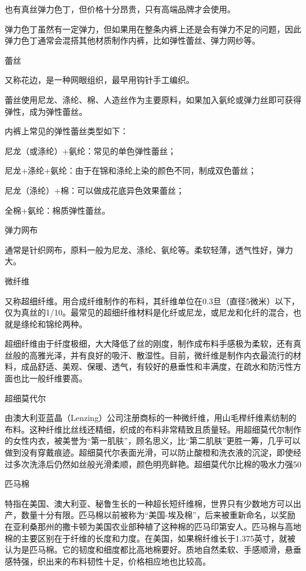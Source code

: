 \documentclass[12pt,UTF8]{ctexbook}
\begin{document}
也有真丝弹力色丁，但价格十分昂贵，只有高端品牌才会使用。

弹力色丁虽然有一定弹力，但如果用在整条内裤上还是会有弹力不足的问题，因此弹力色丁通常会混搭其他材质制作内裤，比如弹性蕾丝、弹力网纱等。

蕾丝

又称花边，是一种网眼组织，最早用钩针手工编织。

蕾丝使用尼龙、涤纶、棉、人造丝作为主要原料，如果加入氨纶或弹力丝即可获得弹性，成为弹性蕾丝。

内裤上常见的弹性蕾丝类型如下：

尼龙（或涤纶）+氨纶：常见的单色弹性蕾丝；

尼龙+涤纶+氨纶：由于在锦和涤纶上染的颜色不同，制成双色蕾丝；

尼龙（涤纶）+棉：可以做成花底异色效果蕾丝；

全棉+氨纶：棉质弹性蕾丝。

弹力网布

通常是针织网布，原料一般为尼龙、涤纶、氨纶等。柔软轻薄，透气性好，弹力大。

微纤维

又称超细纤维。用合成纤维制作的布料，其纤维单位在0.3旦（直径5微米）以下，仅为真丝的1/10。最常见的超细纤维材料是化纤或尼龙，或尼龙和化纤的混合，也就是绦纶和锦纶两种。

超细纤维由于纤度极细，大大降低了丝的刚度，制作成布料手感极为柔软，还有真丝般的高雅光泽，并有良好的吸汗、散湿性。目前，微纤维是制作内衣最流行的材料，成品舒适、美观、保暖、透气，有较好的悬垂性和丰满度，在疏水和防污性方面也比一般纤维要高。

超细莫代尔

由澳大利亚蓝晶（Lenzing）公司注册商标的一种微纤维，用山毛榉纤维素纺制的布料。这种纤维比丝线还精细，织成的布料非常精致且质量轻。用超细莫代尔制作的女性内衣，被美誉为“第一肌肤”，顾名思义，比“第二肌肤”更胜一筹，几乎可以做到没有穿戴痕迹。超细莫代尔表面光滑，可以防止酸橙和洗衣液的沉淀，即使经过多次洗涤后仍然如丝般光滑柔顺，颜色明亮鲜艳。超细莫代尔比棉的吸水力强50%

匹马棉

特指在美国、澳大利亚、秘鲁生长的一种超长短纤维棉，世界只有少数地方可以出产，数量十分有限。匹马棉以前被称为“美国-埃及棉”，后来被重新命名，以奖励在亚利桑那州的撒卡顿为美国农业部种植了这种棉的匹马印第安人。匹马棉与高地棉的主要区别在于纤维的长度和力度。在美国，如果棉纤维长于1.375英寸，就被认为是匹马棉。它的韧度和细度都比高地棉要好。质地自然柔软、手感顺滑，悬垂感特强，织出来的布料韧性十足，价格相应地也比较高。
\end{document}
